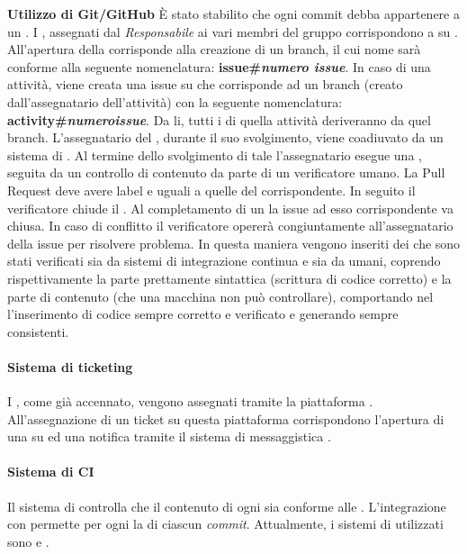 \textbf{Utilizzo di Git/GitHub}
È stato stabilito che ogni commit debba appartenere a un . I , assegnati dal \textit{Responsabile} ai vari membri del gruppo corrispondono a  su . All'apertura della  corrisponde alla creazione di un branch, il cui nome sarà conforme alla seguente nomenclatura: \textbf{issue\#\textit{numero issue}}. In caso di una attivit\`a, viene creata una issue su  che corrisponde ad un branch (creato dall'assegnatario dell'attivit\`a) con la seguente nomenclatura: \textbf{activity\#\textit{numeroissue}}. Da li, tutti i  di quella attivit\`a deriveranno da quel branch. L'assegnatario del , durante il suo svolgimento, viene coadiuvato da un sistema di . Al termine dello svolgimento di tale  l'assegnatario esegue una , seguita da un controllo di contenuto da parte di un verificatore umano. La Pull Request deve avere label e  uguali a quelle del  corrispondente. In seguito il verificatore
chiude il . Al completamento di un  la issue ad esso corrispondente va chiusa. In caso di conflitto il verificatore operer\`a congiuntamente all'assegnatario della issue per risolvere problema.
In questa maniera vengono inseriti dei  che sono stati verificati sia da sistemi di integrazione continua e sia da umani, coprendo rispettivamente la parte prettamente sintattica (scrittura di codice corretto) e la parte di contenuto (che una macchina non pu\`o controllare), comportando nel  l'inserimento di codice sempre corretto e verificato e generando  sempre consistenti.

\paragraph*{Sistema di ticketing} I , come già accennato, vengono assegnati tramite la piattaforma . All'assegnazione di un ticket su questa piattaforma corrispondono l'apertura di una  su  ed una notifica tramite il sistema di messaggistica .

\paragraph*{Sistema di CI}Il sistema di  controlla che il contenuto di ogni  sia conforme alle \NormeDiProgetto. L'integrazione con  permette per ogni  la  di ciascun \textit{commit}. Attualmente, i sistemi di  utilizzati sono  e .

